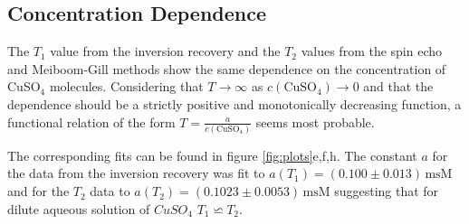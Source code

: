 \documentclass[a4paper]{scrartcl}
\numberwithin{equation}{section}
\numberwithin{figure}{section}
\numberwithin{table}{section}
\begin{document}
\subsection{Concentration Dependence}
The $T_1$ value from the inversion recovery and the $T_2$ values from the spin echo and Meiboom-Gill methods show the same dependence on the concentration of CuSO$_4$ molecules. Considering that $T\rightarrow\infty$ as $c(\text{CuSO}_4)\rightarrow 0$ and that the dependence should be a strictly positive and monotonically decreasing function, a functional relation of the form $T=\frac{a}{c(\text{CuSO}_4)}$ seems most probable.

The corresponding fits can be found in figure \ref{fig:plots}e,f,h. The constant $a$ for the data from the inversion recovery was fit to $a(T_1)=(0.100\pm 0.013)\,\text{msM}$ and for the $T_2$ data to $a(T_2)=(0.1023\pm 0.0053)\,\text{msM}$ suggesting that for dilute aqueous solution of $CuSO_4$ $T_1\backsimeq T_2$.
\end{document}
